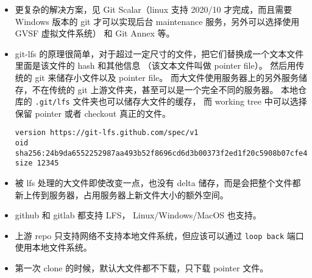 
\begin{issues}
\issueDraft
\end{issues}

\begin{itemize}
\item 更复杂的解决方案，见 Git Scalar（linux 支持 2020/10 才完成，而且需要 Windows 版本的 git 才可以实现后台 maintenance 服务，另外可以选择使用 GVSF 虚拟文件系统） 和 Git Annex 等。
\item git-lfs 的原理很简单，对于超过一定尺寸的文件，把它们替换成一个文本文件里面是该文件的 hash 和其他信息 （该文本文件叫做 pointer file）。 然后用传统的 git 来储存小文件以及 pointer file。 而大文件使用服务器上的另外服务储存，不在传统的 git 上游文件夹，甚至可以是一个完全不同的服务器。 本地仓库的 \verb`.git/lfs` 文件夹也可以储存大文件的缓存， 而 working tree 中可以选择保留 pointer 或者 checkout 真正的文件。
\begin{lstlisting}[language=none,caption=example\_pointer\_file]
version https://git-lfs.github.com/spec/v1
oid sha256:24b9da6552252987aa493b52f8696cd6d3b00373f2ed1f20c5908b07cfe4f2c0
size 12345
\end{lstlisting}
\item 被 lfs 处理的大文件即使改变一点，也没有 delta 储存，而是会把整个文件都新上传到服务器，占用服务器上新文件大小的额外空间。
\item github 和 gitlab 都支持 LFS， Linux/Windows/MacOS 也支持。
\item 上游 repo 只支持网络不支持本地文件系统，但应该可以通过 \verb`loop back` 端口使用本地文件系统。
\item 第一次 clone 的时候，默认大文件都不下载，只下载 pointer 文件。
\end{itemize}
